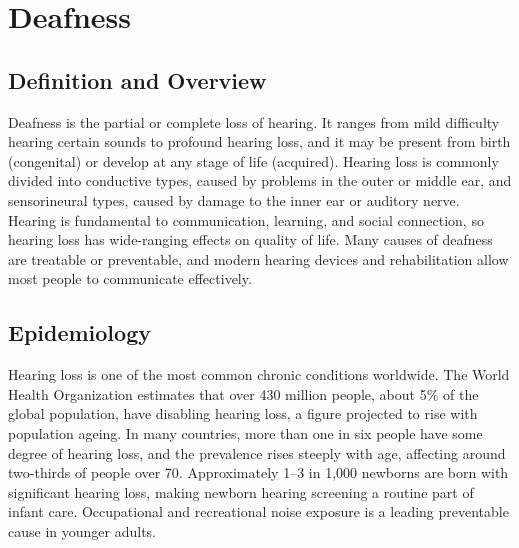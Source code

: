\chapter{Deafness}

\section*{Definition and Overview}
Deafness is the partial or complete loss of hearing. It ranges from mild difficulty hearing certain sounds to profound hearing loss, and it may be present from birth (congenital) or develop at any stage of life (acquired). Hearing loss is commonly divided into conductive types, caused by problems in the outer or middle ear, and sensorineural types, caused by damage to the inner ear or auditory nerve. Hearing is fundamental to communication, learning, and social connection, so hearing loss has wide-ranging effects on quality of life. Many causes of deafness are treatable or preventable, and modern hearing devices and rehabilitation allow most people to communicate effectively.

\section*{Epidemiology}
Hearing loss is one of the most common chronic conditions worldwide. The World Health Organization estimates that over 430 million people, about 5\% of the global population, have disabling hearing loss, a figure projected to rise with population ageing. In many countries, more than one in six people have some degree of hearing loss, and the prevalence rises steeply with age, affecting around two-thirds of people over 70. Approximately 1--3 in 1,000 newborns are born with significant hearing loss, making newborn hearing screening a routine part of infant care. Occupational and recreational noise exposure is a leading preventable cause in younger adults.

